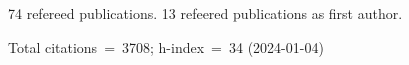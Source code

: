 74 refereed publications. 13 refeered publications as first author.

Total citations~=~3708; h-index~=~34 (2024-01-04)
